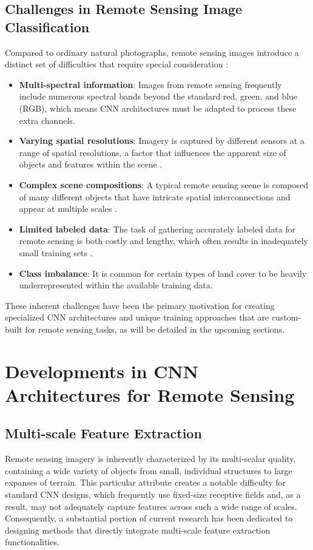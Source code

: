 \documentclass[12pt,a4paper]{article}
\begin{document}
\subsection{Challenges in Remote Sensing Image Classification}
Compared to ordinary natural photographs, remote sensing images introduce a distinct set of difficulties that require special consideration \cite{zhu2017deep}:

\begin{itemize}
\item \textbf{Multi-spectral information}: Images from remote sensing frequently include numerous spectral bands beyond the standard red, green, and blue (RGB), which means CNN architectures must be adapted to process these extra channels.
\item \textbf{Varying spatial resolutions}: Imagery is captured by different sensors at a range of spatial resolutions, a factor that influences the apparent size of objects and features within the scene \cite{cheng2016survey}.
\item \textbf{Complex scene compositions}: A typical remote sensing scene is composed of many different objects that have intricate spatial interconnections and appear at multiple scales \cite{xia2017aid}.
\item \textbf{Limited labeled data}: The task of gathering accurately labeled data for remote sensing is both costly and lengthy, which often results in inadequately small training sets \cite{zhu2017deep}.
\item \textbf{Class imbalance}: It is common for certain types of land cover to be heavily underrepresented within the available training data.
\end{itemize}

These inherent challenges have been the primary motivation for creating specialized CNN architectures and unique training approaches that are custom-built for remote sensing tasks, as will be detailed in the upcoming sections.

\section{Developments in CNN Architectures for Remote Sensing}
\label{sec:developments}

\subsection{Multi-scale Feature Extraction}
Remote sensing imagery is inherently characterized by its multi-scalar quality, containing a wide variety of objects from small, individual structures to large expanses of terrain. This particular attribute creates a notable difficulty for standard CNN designs, which frequently use fixed-size receptive fields and, as a result, may not adequately capture features across such a wide range of scales. Consequently, a substantial portion of current research has been dedicated to designing methods that directly integrate multi-scale feature extraction functionalities.
\end{document}
